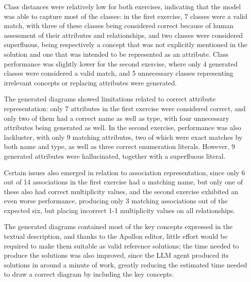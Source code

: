 Class distances were relatively low for both exercises, indicating that the model was able to capture most of the classes: in the first exercise, 7 classes were a valid match, with three of these classes being considered correct because of human assessment of their attributes and relationships, and two classes were considered superfluous, being respectively a concept that was not explicitly mentioned in the solution and one that was intended to be represented as an attribute. Class performance was slightly lower for the second exercise, where only 4 generated classes were considered a valid match, and 5 unnecessary classes representing irrelevant concepts or replacing attributes were generated.

The generated diagrams showed limitations related to correct attribute representation: only 7 attributes in the first exercise were considered correct, and only two of them had a correct name as well as type, with four unnecessary attributes being generated as well. In the second exercise, performance was also lackluster, with only 9 matching attributes, two of which were exact matches by both name and type, as well as three correct enumeration literals. However, 9 generated attributes were hallucinated, together with a superfluous literal.

Certain issues also emerged in relation to association representation, since only 6 out of 14 associations in the first exercise had a matching name, but only one of these also had correct multiplicity values, and the second exercise exhibited an even worse performance, producing only 3 matching associations out of the expected six, but placing incorrect 1-1 multiplicity values on all relationships.

The generated diagrams contained most of the key concepts expressed in the textual description, and thanks to the Apollon editor, little effort would be required to make them suitable as valid reference solutions; the time needed to produce the solutions was also improved, since the LLM agent produced its solutions in around a minute of work, greatly reducing the estimated time needed to draw a correct diagram by including the key concepts.



